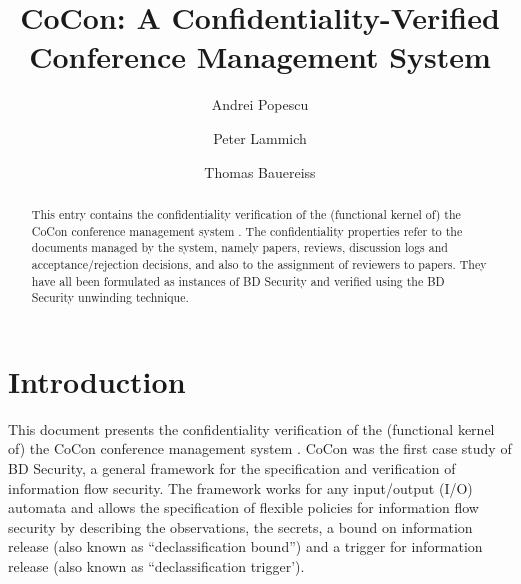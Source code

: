 \documentclass[11pt,a4paper]{article}
\begin{document}
\title{CoCon: A Confidentiality-Verified Conference Management System}
\author{Andrei Popescu \and Peter Lammich \and Thomas Bauereiss}
\maketitle

\begin{abstract}
	This entry contains the confidentiality verification of the (functional kernel of) the CoCon conference management system \cite{cocon-CAV2014,cocon-JAR2021}.
	The confidentiality properties refer to the documents managed by the system, namely
	papers, reviews, discussion logs and acceptance/rejection decisions, and also to the assignment of reviewers to papers. They have all been formulated as instances
	of BD Security \cite{BDsecurity-ITP2021,BDSecurity-AFP} and verified using the BD Security unwinding technique.
\end{abstract}

\tableofcontents


\section{Introduction}


This document presents the confidentiality verification of the (functional kernel of) the CoCon conference management system \cite{cocon-CAV2014,cocon-JAR2021}.
%
CoCon was the first case study of BD Security, a general framework for the specification and verification of information flow security.
The framework works for any input/output (I/O) automata and allows the specification of flexible policies for information flow security by describing the observations, the secrets, a bound on information release (also known as ``declassification bound'') and a trigger for information release (also known as ``declassification trigger').
\end{document}
